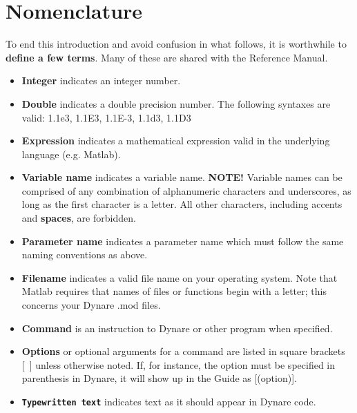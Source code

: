 \section{Nomenclature}
To end this introduction and avoid confusion in what follows, it is worthwhile to \textbf{define a few terms}. Many of these are shared with the Reference Manual. 
\begin{itemize}
\item \textbf{Integer} indicates an integer number.
\item \textbf{Double} indicates a double precision number. The following syntaxes are valid: 1.1e3, 1.1E3, 1.1E-3, 1.1d3, 1.1D3
\item \textbf{Expression} indicates a mathematical expression valid in the underlying language (e.g. Matlab).
\item \textbf{Variable name} indicates a variable name. \textbf{\textsf{NOTE!}} Variable names can be comprised of any combination of alphanumeric characters and underscores, as long as the first character is a letter. All other characters, including accents and \textbf{spaces}, are forbidden. 
\item \textbf{Parameter name} indicates a parameter name which must follow the same naming conventions as above. 
\item \textbf{Filename} indicates a valid file name on your operating system. Note that Matlab requires that names of files or functions begin with a letter; this concerns your Dynare .mod files.
\item \textbf{Command} is an instruction to Dynare or other program when specified. 
\item \textbf{Options} or optional arguments for a command are listed in square brackets \mbox{[ ]} unless otherwise noted. If, for instance, the option must be specified in parenthesis in Dynare, it will show up in the Guide as [(option)].
\item \textbf{\texttt{Typewritten text}} indicates text as it should appear in Dynare code.
\end{itemize}

